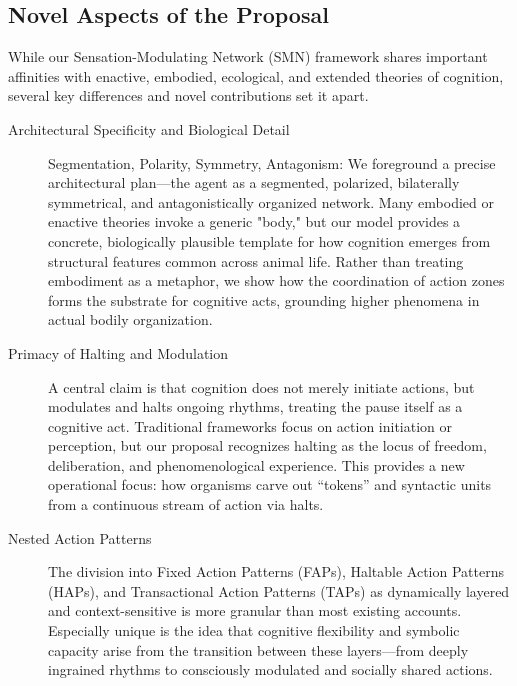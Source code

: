 \subsection{Novel Aspects of the Proposal}
While our Sensation-Modulating Network (SMN) framework shares important affinities with enactive, embodied, ecological, and extended theories of cognition, several key differences and novel contributions set it apart. 
\begin{description}
    \item[Architectural Specificity and Biological Detail] 
    Segmentation, Polarity, Symmetry, Antagonism: We foreground a precise architectural plan—the agent as a segmented, polarized, bilaterally symmetrical, and antagonistically organized network. Many embodied or enactive theories invoke a generic "body," but our model provides a concrete, biologically plausible template for how cognition emerges from structural features common across animal life.      Rather than treating embodiment as a metaphor, we show how the coordination of action zones forms the substrate for cognitive acts, grounding higher phenomena in actual bodily organization.

    \item[Primacy of Halting and Modulation]
    A central claim is that cognition does not merely initiate actions, but modulates and halts ongoing rhythms, treating the pause itself as a cognitive act. Traditional frameworks focus on action initiation or perception, but our proposal recognizes halting as the locus of freedom, deliberation, and phenomenological experience.  This provides a new operational focus: how organisms carve out “tokens” and syntactic units from a continuous stream of action via halts.

    \item[Nested Action Patterns] 
    The division into Fixed Action Patterns (FAPs), Haltable Action Patterns (HAPs), and Transactional Action Patterns (TAPs) as dynamically layered and context-sensitive is more granular than most existing accounts. Especially unique is the idea that cognitive flexibility and symbolic capacity arise from the transition between these layers—from deeply ingrained rhythms to consciously modulated and socially shared actions.


\end{description}
